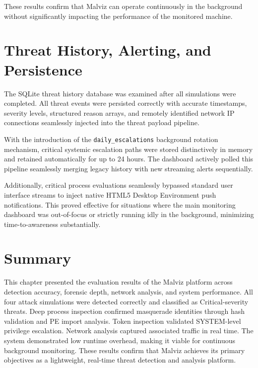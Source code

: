 These results confirm that Malviz can operate continuously in the background without significantly impacting the performance of the monitored machine.

\section{Threat History, Alerting, and Persistence}

The SQLite threat history database was examined after all simulations were completed. All threat events were persisted correctly with accurate timestamps, severity levels, structured reason arrays, and remotely identified network IP connections seamlessly injected into the threat payload pipeline. 

With the introduction of the \texttt{daily\_escalations} background rotation mechanism, critical systemic escalation paths were stored distinctively in memory and retained automatically for up to 24 hours. The dashboard actively polled this pipeline seamlessly merging legacy history with new streaming alerts sequentially.

Additionally, critical process evaluations seamlessly bypassed standard user interface streams to inject native HTML5 Desktop Environment push notifications. This proved effective for situations where the main monitoring dashboard was out-of-focus or strictly running idly in the background, minimizing time-to-awareness substantially.

\section{Summary}

This chapter presented the evaluation results of the Malviz platform across detection accuracy, forensic depth, network analysis, and system performance. All four attack simulations were detected correctly and classified as Critical-severity threats. Deep process inspection confirmed masquerade identities through hash validation and PE import analysis. Token inspection validated SYSTEM-level privilege escalation. Network analysis captured associated traffic in real time. The system demonstrated low runtime overhead, making it viable for continuous background monitoring. These results confirm that Malviz achieves its primary objectives as a lightweight, real-time threat detection and analysis platform.
